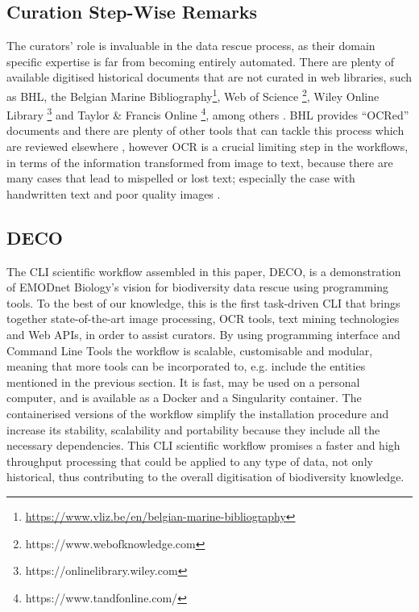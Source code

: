    \subsection{Curation Step-Wise Remarks}
   The curators’ role is invaluable in the data rescue process, as their domain
specific expertise is far from becoming entirely automated. There are plenty of
available digitised historical documents that are not curated in web libraries,
such as BHL, the Belgian Marine
Bibliography\footnote{\url{https://www.vliz.be/en/belgian-marine-bibliography}},
Web of Science \footnote{https://www.webofknowledge.com}, Wiley Online
Library \footnote{https://onlinelibrary.wiley.com} and Taylor \& Francis
Online \footnote{https://www.tandfonline.com/}, among others \parencite{kearney_its_2019}.
BHL provides “OCRed” documents and there are plenty of other tools that can
tackle this process which are reviewed elsewhere \parencite{10.3897/rio.6.e58030},
however OCR is a crucial limiting step in the workflows, in terms of the
information transformed from image to text, because there are many cases that
lead to mispelled or lost text; especially the case with handwritten text and
poor quality images \parencite{lyal_digitising_2016}.
   
\subsection{DECO}
   The CLI scientific workflow assembled in this paper, DECO, is a demonstration
of EMODnet Biology’s vision for biodiversity data rescue using programming
tools. To the best of our knowledge, this is the first task-driven CLI that
brings together state-of-the-art image processing, OCR tools, text mining
technologies and Web APIs, in order to assist curators. By using programming
interface and Command Line Tools the workflow is scalable, customisable and
modular, meaning that more tools can be incorporated to, e.g. include the
entities mentioned in the previous section. It is fast, may be used on a
personal computer, and is available as a Docker and a Singularity container.
The containerised versions of the workflow simplify the installation procedure
and increase its stability, scalability and portability because they include
all the necessary dependencies. This CLI scientific workflow promises a faster
and high throughput processing that could be applied to any type of data, not
only historical, thus contributing to the overall digitisation of biodiversity
knowledge.

